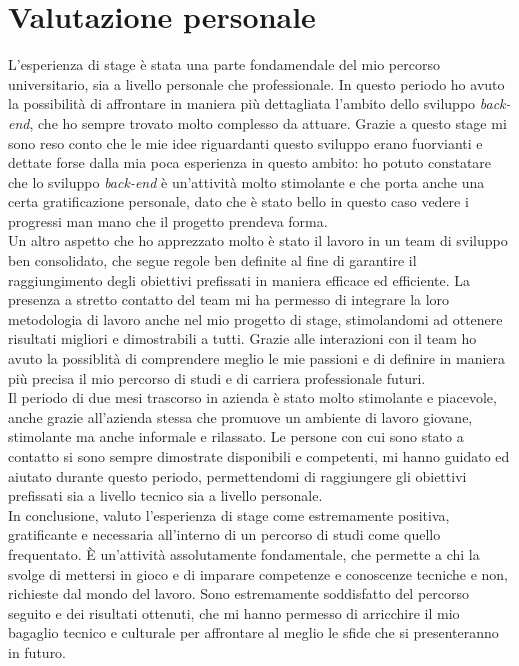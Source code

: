 \section{Valutazione personale}

L'esperienza di stage è stata una parte fondamendale del mio percorso
universitario, sia a livello personale che professionale. In questo periodo ho
avuto la possibilità di affrontare in maniera più dettagliata l'ambito dello sviluppo
\emph{back-end}, che ho sempre trovato molto complesso da attuare. Grazie a
questo stage mi sono reso conto che le mie idee riguardanti questo sviluppo
erano fuorvianti e dettate forse dalla mia poca esperienza in questo ambito: ho
potuto constatare che lo sviluppo \emph{back-end} è un'attività molto stimolante
e che porta anche una certa gratificazione personale, dato che è stato bello in
questo caso vedere i progressi man mano che il progetto prendeva forma.\\
Un altro aspetto che ho apprezzato molto è stato il lavoro in un team di
sviluppo ben consolidato, che segue regole ben definite al fine di garantire il
raggiungimento degli obiettivi prefissati in maniera efficace ed efficiente. La
presenza a stretto contatto del team mi ha permesso di integrare la loro
metodologia di lavoro anche nel mio progetto di stage, stimolandomi ad ottenere
risultati migliori e dimostrabili a tutti. Grazie alle interazioni con il team
ho avuto la possiblità di comprendere meglio le mie passioni e di definire in
maniera più precisa il mio percorso di studi e di carriera professionale
futuri.\\
Il periodo di due mesi trascorso in azienda è stato molto stimolante e
piacevole, anche grazie all'azienda stessa che promuove un ambiente di lavoro
giovane, stimolante ma anche informale e rilassato. Le persone con cui sono
stato a contatto si sono sempre dimostrate disponibili e competenti, mi hanno
guidato ed aiutato durante questo periodo, permettendomi di raggiungere gli
obiettivi prefissati sia a livello tecnico sia a livello personale.\\

In conclusione, valuto l'esperienza di stage come estremamente positiva, gratificante e
necessaria all'interno di un percorso di studi come quello frequentato. È
un'attività assolutamente fondamentale, che permette a chi la svolge di mettersi
in gioco e di imparare competenze e conoscenze tecniche e non, richieste dal
mondo del lavoro. Sono estremamente soddisfatto del percorso seguito e dei
risultati ottenuti, che mi hanno permesso di arricchire il mio bagaglio tecnico
e culturale per affrontare al meglio le sfide che si presenteranno in futuro.